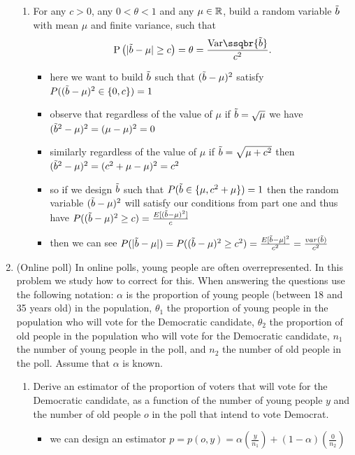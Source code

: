 \documentclass[12pt,twoside]{article}
\begin{document}
\begin{enumerate}
\begin{enumerate}
\item For any $c >0$, any $0 < \theta < 1$ and any $\mu \in \mathbb{R}$, build a random variable $\tilde{  b }$ with mean $\mu$ and finite variance, such that 
\begin{align}
\P\brac{ | \rb - \mu | \geq c} = \theta = \frac{\var\ssqbr{\rb} }{c^2}.
\end{align} 
\begin{itemize}
    \item here we want to build $\Tilde{b}$ such that $(\Tilde{b}-\mu)^2$ satisfy  $P((\Tilde{b}-\mu)^{2}\in \{0,c\})=1$
    \item observe that regardless of the value of $\mu$ if $\Tilde{b}=\sqrt{\mu}$ we have $(\Tilde{b}^{2}-\mu)^2=(\mu-\mu)^2=0$
    \item similarly regardless of the value of $\mu$ if $\Tilde{b}=\sqrt{\mu+c^2}$ then $(\Tilde{b}^{2}-\mu)^2=(c^2+\mu-\mu)^2=c^2$
    \item so if we  design $\Tilde{b}$ such that $P(\Tilde{b}\in \{\mu, c^2+\mu\})=1$ then the random variable $(\Tilde{b}-\mu)^2$ will satisfy our conditions from part one and thus have $P((\Tilde{b}-\mu)^2\geq c)=\frac{E[(\Tilde{b}-\mu)^2]}{c}$
    \item then we can see $P(|\Tilde{b}-\mu|)=P((\Tilde{b}-\mu)^2\geq c^2)= \frac{E[\Tilde{b}-\mu]^2}{c^2}=\frac{var(\Tilde{b})}{c^2}$
\end{itemize}
\end{enumerate}
\newpage
\item (Online poll) In online polls, young people are often overrepresented. In this problem we study how to correct for this. When answering the questions use the following notation: $\alpha$ is the proportion of young people (between 18 and 35 years old) in the population, $\theta_1$ the proportion of young people in the population who will vote for the Democratic candidate, $\theta_2$ the proportion of old people in the population who will vote for the Democratic candidate, $n_1$ the number of young people in the poll, and $n_2$ the number of old people in the poll. Assume that $\alpha$ is known.
\begin{enumerate}
\item Derive an estimator of the proportion of voters that will vote for the Democratic candidate, as a function of the number of young people $y$ and the number of old people $o$ in the poll that intend to vote Democrat. 
\begin{itemize}
    \item we can design an estimator $p=p(o,y)=\alpha(\frac{y}{n_1})+(1-\alpha)(\frac{0}{n_2})$

\end{itemize}
\end{enumerate}
\end{enumerate}
\end{document}
